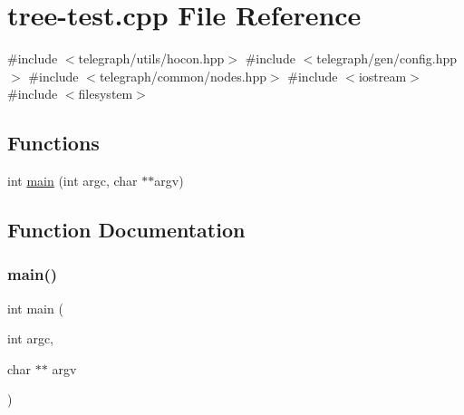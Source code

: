 \hypertarget{tree-test_8cpp}{}\section{tree-\/test.cpp File Reference}
\label{tree-test_8cpp}
{\ttfamily \#include $<$telegraph/utils/hocon.\+hpp$>$}\newline
{\ttfamily \#include $<$telegraph/gen/config.\+hpp$>$}\newline
{\ttfamily \#include $<$telegraph/common/nodes.\+hpp$>$}\newline
{\ttfamily \#include $<$iostream$>$}\newline
{\ttfamily \#include $<$filesystem$>$}\newline
\subsection*{Functions}
\begin{DoxyCompactItemize}
\item 
int \hyperlink{tree-test_8cpp_a3c04138a5bfe5d72780bb7e82a18e627}{main} (int argc, char $\ast$$\ast$argv)
\end{DoxyCompactItemize}


\subsection{Function Documentation}
\mbox{\label{tree-test_8cpp_a3c04138a5bfe5d72780bb7e82a18e627}} 
\subsubsection{\texorpdfstring{main()}{main()}}
{\footnotesize\ttfamily int main (\begin{DoxyParamCaption}\item[{int}]{argc,  }\item[{char $\ast$$\ast$}]{argv }\end{DoxyParamCaption})}


